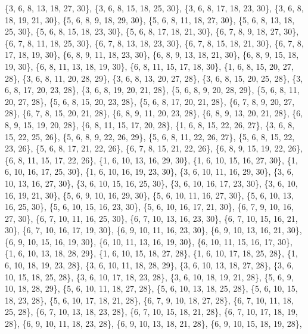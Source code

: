 \documentclass[11pt,a4paper]{article}
\begin{document}
{\{3, 6, 8, 13, 18, 27, 30\}, \{3, 6, 8, 15, 18, 25, 30\}, \{3, 6, 8, 17, 18, 23, 30\}, \{3, 6, 8, 18, 19, 21, 30\}, \{5, 6, 8, 9, 18, 29, 30\},
\{5, 6, 8, 11, 18, 27, 30\}, \{5, 6, 8, 13, 18, 25, 30\}, \{5, 6, 8, 15, 18, 23, 30\}, \{5, 6, 8, 17, 18, 21, 30\}, \{6, 7, 8, 9, 18, 27, 30\},
\{6, 7, 8, 11, 18, 25, 30\}, \{6, 7, 8, 13, 18, 23, 30\}, \{6, 7, 8, 15, 18, 21, 30\}, \{6, 7, 8, 17, 18, 19, 30\}, \{6, 8, 9, 11, 18, 23, 30\},
\{6, 8, 9, 13, 18, 21, 30\}, \{6, 8, 9, 15, 18, 19, 30\}, \{6, 8, 11, 13, 18, 19, 30\}, \{6, 8, 11, 15, 17, 18, 30\}, \{1, 6, 8, 15, 20, 27, 28\},
\{3, 6, 8, 11, 20, 28, 29\}, \{3, 6, 8, 13, 20, 27, 28\}, \{3, 6, 8, 15, 20, 25, 28\}, \{3, 6, 8, 17, 20, 23, 28\}, \{3, 6, 8, 19, 20, 21, 28\},
\{5, 6, 8, 9, 20, 28, 29\}, \{5, 6, 8, 11, 20, 27, 28\}, \{5, 6, 8, 15, 20, 23, 28\}, \{5, 6, 8, 17, 20, 21, 28\}, \{6, 7, 8, 9, 20, 27, 28\},
\{6, 7, 8, 15, 20, 21, 28\}, \{6, 8, 9, 11, 20, 23, 28\}, \{6, 8, 9, 13, 20, 21, 28\}, \{6, 8, 9, 15, 19, 20, 28\}, \{6, 8, 11, 15, 17, 20, 28\},
\{1, 6, 8, 15, 22, 26, 27\}, \{3, 6, 8, 15, 22, 25, 26\}, \{5, 6, 8, 9, 22, 26, 29\}, \{5, 6, 8, 11, 22, 26, 27\}, \{5, 6, 8, 15, 22, 23, 26\},
\{5, 6, 8, 17, 21, 22, 26\}, \{6, 7, 8, 15, 21, 22, 26\}, \{6, 8, 9, 15, 19, 22, 26\}, \{6, 8, 11, 15, 17, 22, 26\}, \{1, 6, 10, 13, 16, 29, 30\},
\{1, 6, 10, 15, 16, 27, 30\}, \{1, 6, 10, 16, 17, 25, 30\}, \{1, 6, 10, 16, 19, 23, 30\}, \{3, 6, 10, 11, 16, 29, 30\}, \{3, 6, 10, 13, 16, 27, 30\},
\{3, 6, 10, 15, 16, 25, 30\}, \{3, 6, 10, 16, 17, 23, 30\}, \{3, 6, 10, 16, 19, 21, 30\}, \{5, 6, 9, 10, 16, 29, 30\}, \{5, 6, 10, 11, 16, 27, 30\},
\{5, 6, 10, 13, 16, 25, 30\}, \{5, 6, 10, 15, 16, 23, 30\}, \{5, 6, 10, 16, 17, 21, 30\}, \{6, 7, 9, 10, 16, 27, 30\}, \{6, 7, 10, 11, 16, 25, 30\},
\{6, 7, 10, 13, 16, 23, 30\}, \{6, 7, 10, 15, 16, 21, 30\}, \{6, 7, 10, 16, 17, 19, 30\}, \{6, 9, 10, 11, 16, 23, 30\}, \{6, 9, 10, 13, 16, 21, 30\},
\{6, 9, 10, 15, 16, 19, 30\}, \{6, 10, 11, 13, 16, 19, 30\}, \{6, 10, 11, 15, 16, 17, 30\}, \{1, 6, 10, 13, 18, 28, 29\}, \{1, 6, 10, 15, 18, 27, 28\},
\{1, 6, 10, 17, 18, 25, 28\}, \{1, 6, 10, 18, 19, 23, 28\}, \{3, 6, 10, 11, 18, 28, 29\}, \{3, 6, 10, 13, 18, 27, 28\}, \{3, 6, 10, 15, 18, 25, 28\},
\{3, 6, 10, 17, 18, 23, 28\}, \{3, 6, 10, 18, 19, 21, 28\}, \{5, 6, 9, 10, 18, 28, 29\}, \{5, 6, 10, 11, 18, 27, 28\}, \{5, 6, 10, 13, 18, 25, 28\},
\{5, 6, 10, 15, 18, 23, 28\}, \{5, 6, 10, 17, 18, 21, 28\}, \{6, 7, 9, 10, 18, 27, 28\}, \{6, 7, 10, 11, 18, 25, 28\}, \{6, 7, 10, 13, 18, 23, 28\},
\{6, 7, 10, 15, 18, 21, 28\}, \{6, 7, 10, 17, 18, 19, 28\}, \{6, 9, 10, 11, 18, 23, 28\}, \{6, 9, 10, 13, 18, 21, 28\}, \{6, 9, 10, 15, 18, 19, 28\},
}
\end{document}

